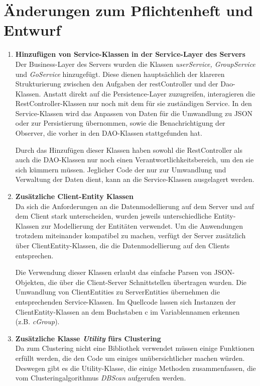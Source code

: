 \documentclass[11pt,a4paper]{scrartcl}
\begin{document}
\section{Änderungen zum Pflichtenheft und Entwurf}
\begin{enumerate}
	\item \textbf{Hinzufügen von Service-Klassen in der Service-Layer des Servers}\\
	Der Business-Layer des Servers wurden die Klassen \textit{userService, GroupService} und \textit{GoService} hinzugefügt. Diese dienen hauptsächlich der klareren Strukturierung zwischen den Aufgaben der restController und der Dao-Klassen. Anstatt direkt auf die Persistence-Layer zuzugreifen, interagieren die RestController-Klassen nur noch mit dem für sie zuständigen Service. In den Service-Klassen wird das Anpassen von Daten für die Umwandlung zu JSON oder zur Persistierung übernommen, sowie die Benachrichtigung der Observer, die vorher in den DAO-Klassen stattgefunden hat.
	
Durch das Hinzufügen dieser Klassen haben sowohl die RestController als auch die DAO-Klassen nur noch einen Verantwortlichkeitsbereich, um den sie sich kümmern müssen. Jeglicher Code der nur zur Umwandlung und Verwaltung der Daten dient, kann an die Service-Klassen ausgelagert werden.

	\item \textbf{Zusätzliche Client-Entity Klassen}\\
	Da sich die Anforderungen an die Datenmodellierung auf dem Server und auf dem Client stark unterscheiden, wurden jeweils unterschiedliche Entity-Klassen zur Modellierung der Entitäten verwendet. Um die Anwendungen trotzdem miteinander kompatibel zu machen, verfügt der Server zusätzlich über ClientEntity-Klassen, die die Datenmodellierung auf den Clients entsprechen.
	
	Die Verwendung dieser Klassen erlaubt das einfache Parsen von JSON-Objekten, die über die Client-Server Schnittstellen übertragen wurden. Die Umwandlung von ClientEntities zu ServerEntities übernehmen die entsprechenden Service-Klassen. Im Quellcode lassen sich Instanzen der ClientEntity-Klassen an dem Buchstaben c im Variablennamen erkennen (z.B. \textit{cGroup}).
	
	\item \textbf{Zusätzliche Klasse \textit{Utility} fürs Clustering}\\
	Da zum Clustering nicht eine Bibliothek verwendet müssen einige Funktionen erfüllt werden, die den Code um einiges unübersichtlicher machen würden. Deswegen gibt es die Utility-Klasse, die einige Methoden zusammenfassen, die vom Clusteringalgorithmus \textit{DBScan} aufgerufen werden.
	

\end{enumerate}
\end{document}

